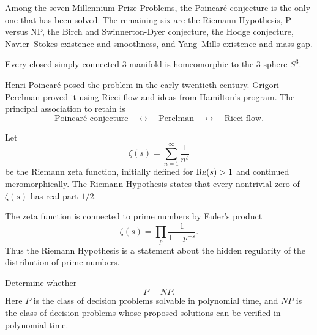     \begin{fact}
        Among the seven Millennium Prize Problems, the Poincaré conjecture is
        the only one that has been solved. The remaining six are the Riemann
        Hypothesis, P versus NP, the Birch and Swinnerton-Dyer conjecture, the
        Hodge conjecture, Navier--Stokes existence and smoothness, and
        Yang--Mills existence and mass gap.
    \end{fact}

    \begin{theorem}
        Every closed simply connected $3$-manifold is homeomorphic to the
        $3$-sphere $S^3$.
    \end{theorem}

    \begin{remark}
        Henri Poincaré posed the problem in the early twentieth century. Grigori
        Perelman proved it using Ricci flow and ideas from Hamilton's program.
        The principal association to retain is
        \[
            \text{Poincaré conjecture}
            \quad\longleftrightarrow\quad
            \text{Perelman}
            \quad\longleftrightarrow\quad
            \text{Ricci flow}.
        \]
    \end{remark}

    \begin{hypothesis}
        Let
        \[
            \zeta(s)=\sum_{n=1}^{\infty}\frac{1}{n^s}
        \]
        be the Riemann zeta function, initially defined for $\operatorname{Re}(s)>1$ and
        continued meromorphically. The Riemann Hypothesis states that every
        nontrivial zero of $\zeta(s)$ has real part $1/2$.
    \end{hypothesis}

    \begin{idea}
        The zeta function is connected to prime numbers by Euler's product
        \[
            \zeta(s)=\prod_{p}\frac{1}{1-p^{-s}}.
        \]
        Thus the Riemann Hypothesis is a statement about the hidden regularity
        of the distribution of prime numbers.
    \end{idea}

    \begin{openproblem}[P versus NP]
        Determine whether
        \[
            P=NP.
        \]
        Here $P$ is the class of decision problems solvable in polynomial time,
        and $NP$ is the class of decision problems whose proposed solutions can
        be verified in polynomial time.
    \end{openproblem}

